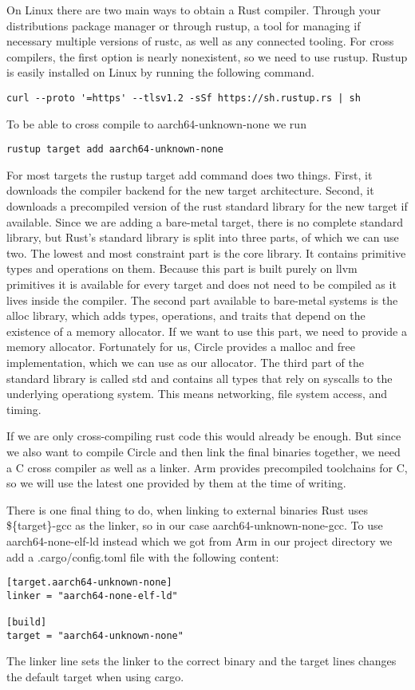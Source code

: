 On Linux there are two main ways to obtain a Rust compiler.
Through your distributions package manager or through rustup,
a tool for managing if necessary multiple versions of rustc, as well as any connected tooling.
For cross compilers, the first option is nearly nonexistent, so we need to use rustup.
Rustup is easily installed on Linux by running the following command.
\begin{verbatim}
curl --proto '=https' --tlsv1.2 -sSf https://sh.rustup.rs | sh
\end{verbatim}
To be able to cross compile to aarch64-unknown-none we run
\begin{verbatim}
rustup target add aarch64-unknown-none
\end{verbatim}
For most targets the rustup target add command does two things.
First, it downloads the compiler backend for the new target architecture.
Second, it downloads a precompiled version of the rust standard library for the new target if available.
Since we are adding a bare-metal target, there is no complete standard library, but Rust's standard library is split into three parts, of which we can use two.
The lowest and most constraint part is the core library.
It contains primitive types and operations on them.
Because this part is built purely on llvm primitives it is available for every target and does not need to be compiled as it lives inside the compiler.
The second part available to bare-metal systems is the alloc library, which adds types, operations, and traits that depend on the existence of a memory allocator.
If we want to use this part, we need to provide a memory allocator.
Fortunately for us, Circle provides a malloc and free implementation, which we can use as our allocator.
The third part of the standard library is called std and contains all types that rely on syscalls to the underlying operationg system.
This means networking, file system access, and timing.

If we are only cross-compiling rust code this would already be enough.
But since we also want to compile Circle and then link the final binaries together, we need a C cross compiler as well as a linker.
Arm provides precompiled toolchains for C, so we will use the latest one provided by them at the time of writing.

There is one final thing to do, when linking to external binaries Rust uses \$\{target\}-gcc as the linker, so in our case aarch64-unknown-none-gcc.
To use aarch64-none-elf-ld instead which we got from Arm in our project directory we add a .cargo/config.toml file with the following content:
\begin{lstlisting}
[target.aarch64-unknown-none]
linker = "aarch64-none-elf-ld"

[build]
target = "aarch64-unknown-none"
\end{lstlisting}
The linker line sets the linker to the correct binary and the target lines changes the default target when using cargo.

